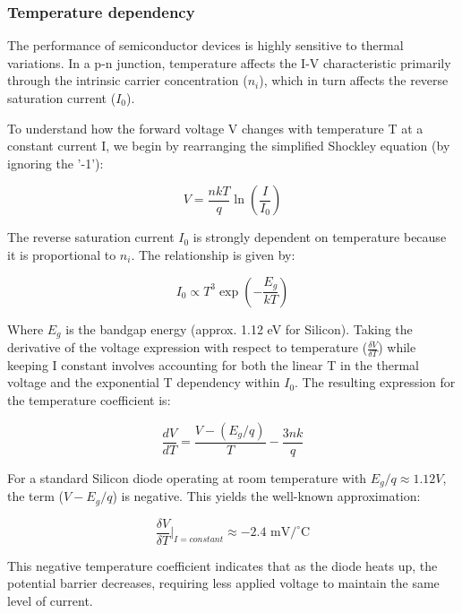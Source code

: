 \documentclass[1pt]{article}
\begin{document}
\subsubsection{Temperature dependency}

The performance of semiconductor devices is highly sensitive to thermal variations. In a p-n junction, temperature affects the I-V characteristic primarily through the intrinsic carrier concentration ($n_i$), which in turn affects the reverse saturation current ($I_0$).

To understand how the forward voltage V changes with temperature T at a constant current I, we begin by rearranging the simplified Shockley equation (by ignoring the '-1'):

\begin{equation}
V = \frac{nkT}{q} \ln\left(\frac{I}{I_0}\right)
\end{equation}

The reverse saturation current $I_0$ is strongly dependent on temperature because it is proportional to $n_i$. The relationship is given by:

\begin{equation}
I_0 \propto T^3 \exp\left(-\frac{E_g}{kT}\right)
\end{equation}

Where $E_g$ is the bandgap energy (approx. 1.12 eV for Silicon). Taking the derivative of the voltage expression with respect to temperature ($\frac{\delta V}{\delta T}$) while keeping I constant involves accounting for both the linear T in the thermal voltage and the exponential T dependency within $I_0$. The resulting expression for the temperature coefficient is:

\begin{equation}
\label{eqn:temprelation}
\frac{dV}{dT} = \frac{V - (E_g/q)}{T} - \frac{3nk}{q}
\end{equation}

For a standard Silicon diode operating at room temperature with $E_g / q \approx 1.12 V$, the term ($V - E_g / q$) is negative. This yields the well-known approximation:

\begin{equation} 
\label{eqn:tempconst}
\frac{\delta V}{\delta T}|_{I = constant} \approx -2.4 \text{ mV/}^\circ\text{C}
\end{equation}

This negative temperature coefficient indicates that as the diode heats up, the potential barrier decreases, requiring less applied voltage to maintain the same level of current.
\end{document}
